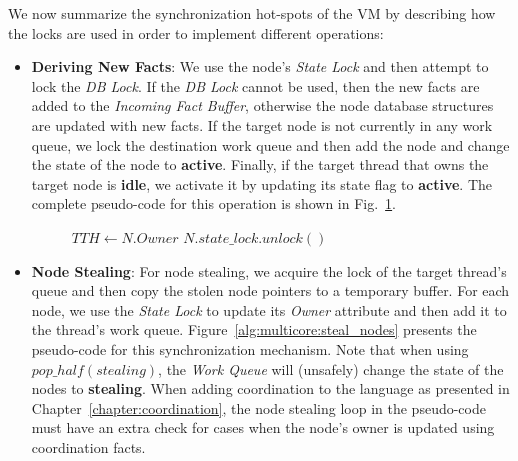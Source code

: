 
We now summarize the synchronization hot-spots of the VM by describing how the locks
are used in order to implement different operations:

\begin{itemize}

   \item \textbf{Deriving New Facts}: We use the node's \emph{State Lock} and
      then attempt to lock the \emph{DB Lock}. If the \emph{DB Lock} cannot be
      used, then the new facts are added to the \emph{Incoming Fact Buffer},
      otherwise the node database structures are updated with new facts. If the
      target node is not currently in any work queue, we lock the destination
      work queue and then add the node and change the state of the node to
      \textbf{active}. Finally, if the target thread that owns the target node
      is \textbf{idle}, we activate it by updating its state flag to
      \textbf{active}. The complete pseudo-code for this operation is shown in
      Fig.~\ref{alg:multicore:new_fact}.

\begin{figure}
\begin{algorithm}[H]
   $TTH \longleftarrow N.Owner$\;
   $N.state\_lock.unlock()$\;
\end{algorithm}
 \label{alg:multicore:new_fact}
\end{figure}


   \item \textbf{Node Stealing}: For node stealing, we acquire the lock of the
      target thread's queue and then copy the stolen node pointers to a
      temporary buffer. For each node, we use the \emph{State Lock} to update
      its \emph{Owner} attribute and then add it to the thread's work queue.
      Figure~\ref{alg:multicore:steal_nodes} presents the pseudo-code for this
      synchronization mechanism. Note that when using $pop\_half(stealing)$, the
      \emph{Work Queue} will (unsafely) change the state of the nodes to
      \textbf{stealing}. When adding coordination to the language as presented
      in Chapter~\ref{chapter:coordination}, the node stealing loop in the
      pseudo-code must have an extra check for cases when the node's owner is
      updated using coordination facts.


\end{itemize}
